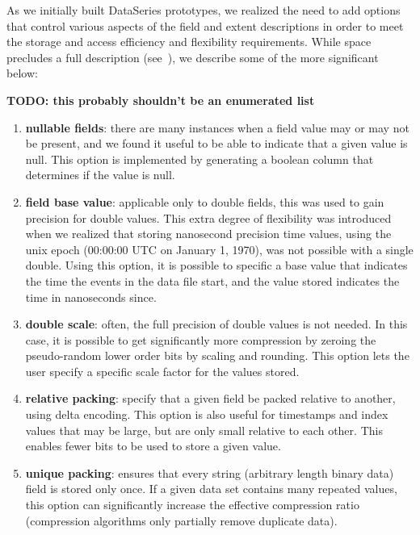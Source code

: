 \documentclass{acm_proc_article-sp}
\begin{document}
As we initially built DataSeries prototypes, we realized the need to
add options that control various aspects of the field and extent
descriptions in order to meet the storage and access efficiency and
flexibility requirements.  While space precludes a full description
(see~\cite{DSTechnicalReportSnapshot}), we describe some of the more
significant below:

{\bf TODO: this probably shouldn't be an enumerated list}

\begin{enumerate}

\item \textbf{nullable fields}: there are many instances when a field
value may or may not be present, and we found it useful to be able to
indicate that a given value is null. This option is implemented by
generating a boolean column that determines if the value is null.

\item \textbf{field base value}: applicable only to double fields,
this was used to gain precision for double values. This extra degree
of flexibility was introduced when we realized that storing nanosecond
precision time values, using the unix epoch (00:00:00 UTC on January
1, 1970), was not possible with a single double. Using this option, it
is possible to specific a base value that indicates the time the
events in the data file start, and the value stored indicates the time
in nanoseconds since.

\item \textbf{double scale}: often, the full precision of double
values is not needed. In this case, it is possible to get
significantly more compression by zeroing the pseudo-random lower
order bits by scaling and rounding. This option lets the user specify
a specific scale factor for the values stored.

\item \textbf{relative packing}: specify that a given field be packed
relative to another, using delta encoding. This option is also useful
for timestamps and index values that may be large, but are only small
relative to each other. This enables fewer bits to be used to store a
given value.

\item \textbf{unique packing}: ensures that every string (arbitrary
length binary data) field is stored only once. If a given data set
contains many repeated values, this option can significantly increase
the effective compression ratio (compression algorithms only partially
remove duplicate data).

\end{enumerate}
\end{document}
